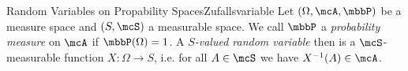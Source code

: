 \begin{mdef}{Random Variables on Propability Spaces}{Zufallsvariable}
    Let $(\Omega,\mcA,\mbbP)$ be a measure space and $(S,\mcS)$ a measurable space. We call $\mbbP$ a \emph{probability measure} on $\mcA$ if $\mbbP(\Omega) = 1$. A \emph{$S$-valued random variable} then is a $\mcS$-measurable function $X:\Omega\to S$, i.e. for all $A\in\mcS$ we have $X^{-1}(A)\in\mcA$.
\end{mdef}